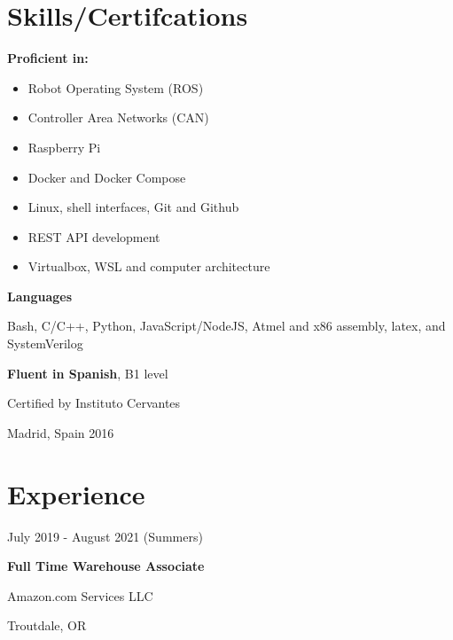 \documentclass[12pt,letterpaper]{article}
\begin{document}
\begin{minipage}[t]{0.45\linewidth}


	\raggedright

		\vspace{0.5cm}
    \section*{Skills/Certifcations}

	\textbf{Proficient in:} 
	\begin{itemize}
		\item Robot Operating System (ROS)
		\item Controller Area Networks (CAN)
		\item Raspberry Pi
		\item Docker and Docker Compose
		\item Linux, shell interfaces, Git and Github
		\item REST API development
		\item Virtualbox, WSL and computer architecture
	\end{itemize}
	\vspace{0.5cm}
	
	\textbf{Languages}

	Bash, C/C++, Python, JavaScript/NodeJS, Atmel and x86 assembly, latex, and SystemVerilog
	\vspace{0.5cm}

	\textbf{Fluent in Spanish}, B1 level

	Certified by Instituto Cervantes

	Madrid, Spain 2016

    
	\section*{Experience}
	July 2019 - August 2021 (Summers)
	
	\textbf{Full Time Warehouse Associate}
	
	Amazon.com Services LLC

	Troutdale, OR
	
	\end{minipage}
\end{document}
